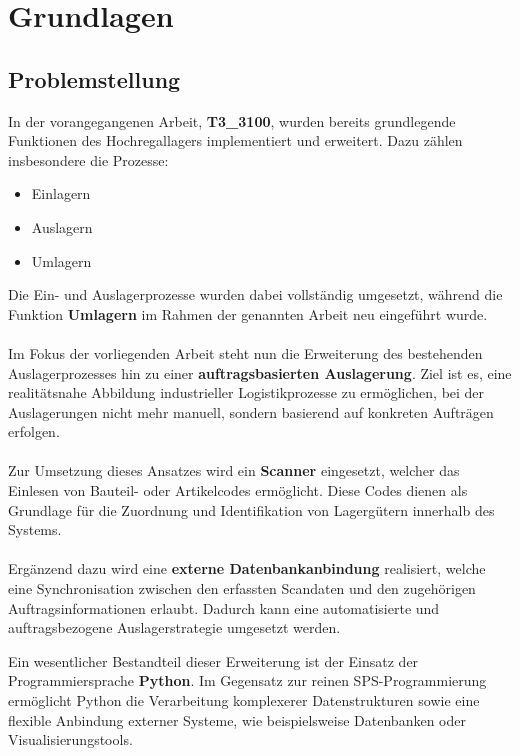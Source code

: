 \section{Grundlagen}
\label{cha:Grundlagen}
\subsection{Problemstellung}

In der vorangegangenen Arbeit, \textbf{T3\_3100}, wurden bereits grundlegende Funktionen des Hochregallagers implementiert und erweitert. Dazu zählen insbesondere die Prozesse:
\begin{itemize}
	\item Einlagern
	\item Auslagern
	\item Umlagern
\end{itemize}

Die Ein- und Auslagerprozesse wurden dabei vollständig umgesetzt, während die Funktion \textbf{Umlagern} im Rahmen der genannten Arbeit neu eingeführt wurde.\\\\
Im Fokus der vorliegenden Arbeit steht nun die Erweiterung des bestehenden Auslagerprozesses hin zu einer \textbf{auftragsbasierten Auslagerung}. Ziel ist es, eine realitätsnahe Abbildung industrieller Logistikprozesse zu ermöglichen, bei der Auslagerungen nicht mehr manuell, sondern basierend auf konkreten Aufträgen erfolgen.\\\\
Zur Umsetzung dieses Ansatzes wird ein \textbf{Scanner} eingesetzt, welcher das Einlesen von Bauteil- oder Artikelcodes ermöglicht. Diese Codes dienen als Grundlage für die Zuordnung und Identifikation von Lagergütern innerhalb des Systems.\\\\
Ergänzend dazu wird eine \textbf{externe Datenbankanbindung} realisiert, welche eine Synchronisation zwischen den erfassten Scandaten und den zugehörigen Auftragsinformationen erlaubt. Dadurch kann eine automatisierte und auftragsbezogene Auslagerstrategie umgesetzt werden.

Ein wesentlicher Bestandteil dieser Erweiterung ist der Einsatz der Programmiersprache \textbf{Python}. Im Gegensatz zur reinen SPS-Programmierung ermöglicht Python die Verarbeitung komplexerer Datenstrukturen sowie eine flexible Anbindung externer Systeme, wie beispielsweise Datenbanken oder Visualisierungstools.

